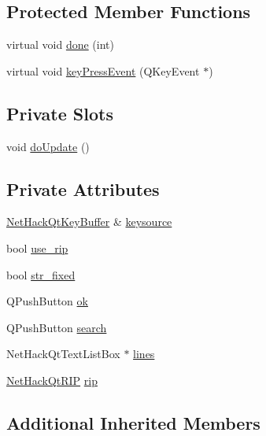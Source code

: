 \subsection*{Protected Member Functions}
\begin{DoxyCompactItemize}
\item 
virtual void \hyperlink{classNetHackQtTextWindow_ae739b0ba3bc7e5e3108a91024f3130a1}{done} (int)
\item 
virtual void \hyperlink{classNetHackQtTextWindow_ab3d65418f862838f6ca3eb6744cc35fe}{key\+Press\+Event} (Q\+Key\+Event $\ast$)
\end{DoxyCompactItemize}
\subsection*{Private Slots}
\begin{DoxyCompactItemize}
\item 
void \hyperlink{classNetHackQtTextWindow_afabe5a905ae22fe47f6b57a7b2c63187}{do\+Update} ()
\end{DoxyCompactItemize}
\subsection*{Private Attributes}
\begin{DoxyCompactItemize}
\item 
\hyperlink{classNetHackQtKeyBuffer}{Net\+Hack\+Qt\+Key\+Buffer} \& \hyperlink{classNetHackQtTextWindow_a87ebb3db2082b34fbb9918e9e58eda99}{keysource}
\item 
bool \hyperlink{classNetHackQtTextWindow_af775fd368d1a1e26c2655f850d3b049c}{use\+\_\+rip}
\item 
bool \hyperlink{classNetHackQtTextWindow_a75af29de4f6d55d027abc4132ef5f786}{str\+\_\+fixed}
\item 
Q\+Push\+Button \hyperlink{classNetHackQtTextWindow_a70453eecbf97c7c2830b5086bd95ae42}{ok}
\item 
Q\+Push\+Button \hyperlink{classNetHackQtTextWindow_a1793178ad401fa8a653543d10cf0a9ea}{search}
\item 
Net\+Hack\+Qt\+Text\+List\+Box $\ast$ \hyperlink{classNetHackQtTextWindow_a33eafaabfd0594c3a3f8673cd52429f5}{lines}
\item 
\hyperlink{classNetHackQtRIP}{Net\+Hack\+Qt\+R\+I\+P} \hyperlink{classNetHackQtTextWindow_a83d61a14cdfed1f73829f2c698b69132}{rip}
\end{DoxyCompactItemize}
\subsection*{Additional Inherited Members}


